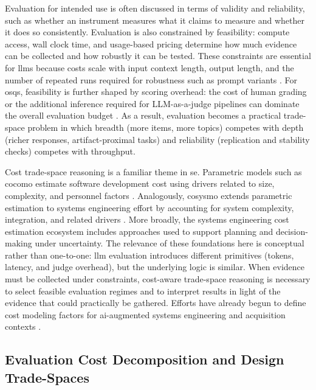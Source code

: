 Evaluation for intended use is often discussed in terms of validity and reliability, such as whether an instrument measures what it claims to measure and whether it does so consistently. Evaluation is also constrained by feasibility: compute access, wall clock time, and usage-based pricing determine how much evidence can be collected and how robustly it can be tested. These constraints are essential for \acp{llm} because costs scale with input context length, output length, and the number of repeated runs required for robustness such as prompt variants \cite{li_llms_as_judges_2024, lu2024bias}. For \acp{osq}, feasibility is further shaped by scoring overhead: the cost of human grading or the additional inference required for LLM-as-a-judge pipelines can dominate the overall evaluation budget \cite{huang_LLMasaJudgeScalableTest_2025, tang_LearningEfficientMultiTurn_2026}. As a result, evaluation becomes a practical trade-space problem in which breadth (more items, more topics) competes with depth (richer responses, artifact-proximal tasks) and reliability (replication and stability checks) competes with throughput.

Cost trade-space reasoning is a familiar theme in \ac{se}. Parametric models such as \ac{cocomo} estimate software development cost using drivers related to size, complexity, and personnel factors \cite{boehm1981software_engineering_economics, boehm_COCOMO2.0_1995}. Analogously, \ac{cosysmo} extends parametric estimation to systems engineering effort by accounting for system complexity, integration, and related drivers \cite{valerdi_COSYSMO_2010, wang_ReuseSystemsEngineering_2010, alstadDevelopmentCOSYSMO302019}. More broadly, the systems engineering cost estimation ecosystem includes approaches used to support planning and decision-making under uncertainty. The relevance of these foundations here is conceptual rather than one-to-one: \ac{llm} evaluation introduces different primitives (tokens, latency, and judge overhead), but the underlying logic is similar. When evidence must be collected under constraints, cost-aware trade-space reasoning is necessary to select feasible evaluation regimes and to interpret results in light of the evidence that could practically be gathered. Efforts have already begun to define cost modeling factors for \ac{ai}-augmented systems engineering and acquisition contexts \cite{madachy_SystemsAcquisitionCost_2024, Madachy_CostModelingAI_2024, madachy_GenerativeAIdrivenSystems_2025}.


\subsection{Evaluation Cost Decomposition and Design Trade-Spaces}
\label{subsec:ch2_cost_decomposition}

